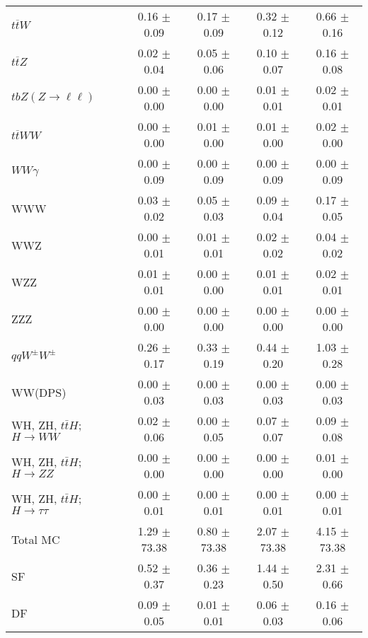 \begin{tabular}{l|cccc}
                   $t\overline{t}W$ &  0.16 $\pm$  0.09 &  0.17 $\pm$  0.09 &  0.32 $\pm$  0.12 &  0.66 $\pm$  0.16 \\
                   $t\overline{t}Z$ &  0.02 $\pm$  0.04 &  0.05 $\pm$  0.06 &  0.10 $\pm$  0.07 &  0.16 $\pm$  0.08 \\
    $tbZ (Z \rightarrow \ell \ell)$ &  0.00 $\pm$  0.00 &  0.00 $\pm$  0.00 &  0.01 $\pm$  0.01 &  0.02 $\pm$  0.01 \\
                  $t\overline{t}WW$ &  0.00 $\pm$  0.00 &  0.01 $\pm$  0.00 &  0.01 $\pm$  0.00 &  0.02 $\pm$  0.00 \\
                         $WW\gamma$ &  0.00 $\pm$  0.09 &  0.00 $\pm$  0.09 &  0.00 $\pm$  0.09 &  0.00 $\pm$  0.09 \\
                                WWW &  0.03 $\pm$  0.02 &  0.05 $\pm$  0.03 &  0.09 $\pm$  0.04 &  0.17 $\pm$  0.05 \\
                                WWZ &  0.00 $\pm$  0.01 &  0.01 $\pm$  0.01 &  0.02 $\pm$  0.02 &  0.04 $\pm$  0.02 \\
                                WZZ &  0.01 $\pm$  0.01 &  0.00 $\pm$  0.00 &  0.01 $\pm$  0.01 &  0.02 $\pm$  0.01 \\
                                ZZZ &  0.00 $\pm$  0.00 &  0.00 $\pm$  0.00 &  0.00 $\pm$  0.00 &  0.00 $\pm$  0.00 \\
                 $qqW^{\pm}W^{\pm}$ &  0.26 $\pm$  0.17 &  0.33 $\pm$  0.19 &  0.44 $\pm$  0.20 &  1.03 $\pm$  0.28 \\
                            WW(DPS) &  0.00 $\pm$  0.03 &  0.00 $\pm$  0.03 &  0.00 $\pm$  0.03 &  0.00 $\pm$  0.03 \\
WH, ZH, $t\bar{t}H$; $H \rightarrow WW$ &  0.02 $\pm$  0.06 &  0.00 $\pm$  0.05 &  0.07 $\pm$  0.07 &  0.09 $\pm$  0.08 \\
WH, ZH, $t\bar{t}H$; $H \rightarrow ZZ$ &  0.00 $\pm$  0.00 &  0.00 $\pm$  0.00 &  0.00 $\pm$  0.00 &  0.01 $\pm$  0.00 \\
WH, ZH, $t\bar{t}H$; $H \rightarrow \tau\tau$ &  0.00 $\pm$  0.01 &  0.00 $\pm$  0.01 &  0.00 $\pm$  0.01 &  0.00 $\pm$  0.01 \\
\hline\hline
                           Total MC &  1.29 $\pm$ 73.38 &  0.80 $\pm$ 73.38 &  2.07 $\pm$ 73.38 &  4.15 $\pm$ 73.38 \\
\hline
                                 SF &  0.52 $\pm$  0.37 &  0.36 $\pm$  0.23 &  1.44 $\pm$  0.50 &  2.31 $\pm$  0.66 \\
                                 DF &  0.09 $\pm$  0.05 &  0.01 $\pm$  0.01 &  0.06 $\pm$  0.03 &  0.16 $\pm$  0.06 \\

\end{tabular}
